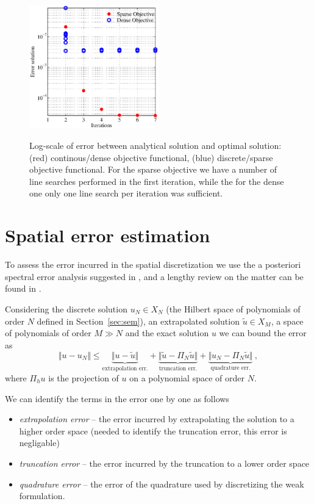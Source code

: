 \documentclass[10pt]{article}
\begin{document}
\begin{figure}[!ht]
\centering
\includegraphics[width=0.5\textwidth]{decayregvsc.eps}
\label{fig:opt_heatass}
\caption{Log-scale of error between analytical solution and optimal solution: (red) continous/dense objective functional, (blue) discrete/sparse objective functional. For the sparse objective we have a number of line searches performed in the first iteration, while the for the dense one only one line search per iteration was sufficient.}
\end{figure}

\section{Spatial error estimation}
\label{sec:err}
To assess the error incurred in the spatial discretization we use the a posteriori spectral error analysis suggested in \cite{Mavriplis1990}, and a lengthy review on the matter can be found in \cite{kopriva2009}. 

Considering the discrete solution $u_N\in X_N$ (the Hilbert space of polynomials of order $N$ defined in Section~\ref{sec:sem}), an extrapolated solution $\tilde u\in X_M$, a space of polynomials of order $M\gg N$ and the exact solution $u$ we can bound the error as
$$\Vert u - u_N\Vert \leq \underbrace{\Vert u-\tilde u\Vert}_{\text{extrapolation err.}} + \underbrace{\Vert \tilde u- \Pi_N \tilde u\Vert}_{\text{truncation err.}} + \underbrace{\Vert u_N-\Pi_N \tilde u\Vert}_{\text{quadrature err.}} \ ,$$
where $\Pi_h u$ is the projection of $u$ on a polynomial space of order $N$.

We can identify the terms in the error one by one as follows
\begin{itemize}
\item \textit{extrapolation error} -- the error incurred by extrapolating the solution to a higher order space (needed to identify the truncation error, this error is negligable)
\item \textit{truncation error} -- the error incurred by the truncation to a lower order space
\item \textit{quadrature error} -- the error of the quadrature used by discretizing the weak formulation.
\end{itemize}
\end{document}
